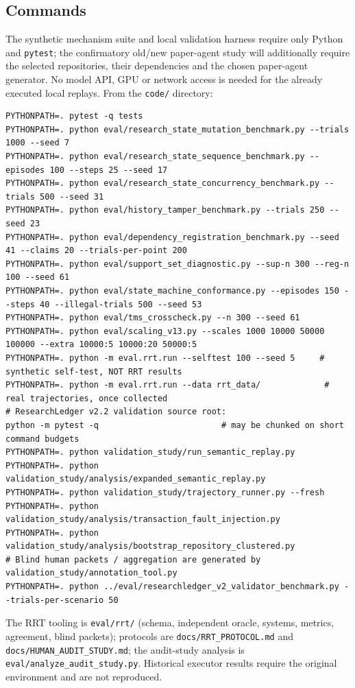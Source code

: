 \documentclass[journal]{IEEEtran}
\begin{document}
\subsection{Commands}
The synthetic mechanism suite and local validation harness require only Python and \texttt{pytest}; the confirmatory old/new paper-agent study will additionally require the selected repositories, their dependencies and the chosen paper-agent generator. No model API, GPU or network access is needed for the already executed local replays. From the \texttt{code/} directory:
\begin{lstlisting}[basicstyle=\scriptsize\ttfamily,breaklines=true]
PYTHONPATH=. pytest -q tests
PYTHONPATH=. python eval/research_state_mutation_benchmark.py --trials 1000 --seed 7
PYTHONPATH=. python eval/research_state_sequence_benchmark.py --episodes 100 --steps 25 --seed 17
PYTHONPATH=. python eval/research_state_concurrency_benchmark.py --trials 500 --seed 31
PYTHONPATH=. python eval/history_tamper_benchmark.py --trials 250 --seed 23
PYTHONPATH=. python eval/dependency_registration_benchmark.py --seed 41 --claims 20 --trials-per-point 200
PYTHONPATH=. python eval/support_set_diagnostic.py --sup-n 300 --reg-n 100 --seed 61
PYTHONPATH=. python eval/state_machine_conformance.py --episodes 150 --steps 40 --illegal-trials 500 --seed 53
PYTHONPATH=. python eval/tms_crosscheck.py --n 300 --seed 61
PYTHONPATH=. python eval/scaling_v13.py --scales 1000 10000 50000 100000 --extra 10000:5 10000:20 50000:5
PYTHONPATH=. python -m eval.rrt.run --selftest 100 --seed 5     # synthetic self-test, NOT RRT results
PYTHONPATH=. python -m eval.rrt.run --data rrt_data/             # real trajectories, once collected
# ResearchLedger v2.2 validation source root:
python -m pytest -q                         # may be chunked on short command budgets
PYTHONPATH=. python validation_study/run_semantic_replay.py
PYTHONPATH=. python validation_study/analysis/expanded_semantic_replay.py
PYTHONPATH=. python validation_study/trajectory_runner.py --fresh
PYTHONPATH=. python validation_study/analysis/transaction_fault_injection.py
PYTHONPATH=. python validation_study/analysis/bootstrap_repository_clustered.py
# Blind human packets / aggregation are generated by validation_study/annotation_tool.py
PYTHONPATH=. python ../eval/researchledger_v2_validator_benchmark.py --trials-per-scenario 50
\end{lstlisting}
The RRT tooling is \texttt{eval/rrt/} (schema, independent oracle, systems, metrics, agreement, blind packets); protocols are \texttt{docs/RRT\_PROTOCOL.md} and \texttt{docs/HUMAN\_AUDIT\_STUDY.md}; the audit-study analysis is \texttt{eval/analyze\_audit\_study.py}. Historical executor results require the original environment and are not reproduced.

\printbibliography
\end{document}
